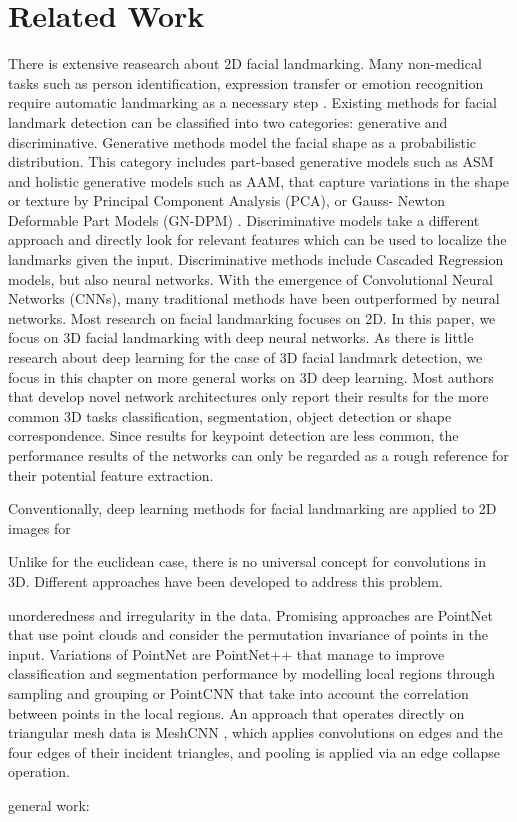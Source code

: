 \documentclass[class=article, crop=false]{standalone}
\begin{document}
\section{Related Work}
\label{sec:works}
There is extensive reasearch about 2D facial landmarking. Many non-medical tasks such as person identification, expression transfer or emotion recognition require automatic landmarking as a necessary step \cite{perrot:hal-02884592}. Existing methods for facial landmark detection can be classified into two categories: generative and discriminative. Generative methods model the facial shape as a probabilistic distribution. This category includes part-based generative models such as ASM and holistic generative models such as AAM, that capture variations in the shape or texture by Principal Component Analysis (PCA), or Gauss- Newton Deformable Part Models (GN-DPM) \cite{yan:hal-02892002}. Discriminative models take a different approach and directly look for relevant features which can be used to localize the landmarks given the input. Discriminative methods include Cascaded Regression models, but also neural networks. With the emergence of Convolutional Neural Networks (CNNs), many traditional methods have been outperformed by neural networks. Most research on facial landmarking focuses on 2D. In this paper, we focus on 3D facial landmarking with deep neural networks. As there is little research about deep learning for the case of 3D facial landmark detection, we focus in this chapter on more general works on 3D deep learning.
Most authors that develop novel network architectures only report their results for the more common 3D tasks classification, segmentation, object detection or shape correspondence. Since results for keypoint detection are less common, the performance results of the networks can only be regarded as a rough reference for their potential feature extraction.

Conventionally, deep learning methods for facial landmarking are applied to 2D images for 



Unlike for the euclidean case, there is no universal concept for convolutions in 3D. Different approaches have been developed to address this problem. 

unorderedness and irregularity in the data. Promising approaches are PointNet \cite{Qi2017} that use point clouds and consider the permutation invariance of points in the input. Variations of PointNet are PointNet++ \cite{Qi2017b} that manage to improve classification and segmentation performance by modelling local regions through sampling and grouping or PointCNN \cite{Li2018} that take into account the correlation between points in the local regions.
An approach that operates directly on triangular mesh data is MeshCNN \cite{Hanocka2019}, which applies convolutions on edges and the four edges of their incident triangles, and pooling is applied via an edge collapse operation.

general work: \cite{Bello2020}
\end{document}
